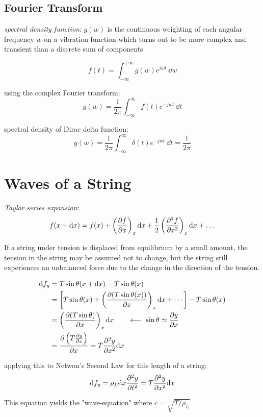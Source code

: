 \documentclass[10pt, a4paper, twocolumn]{article}
\newcommand{\deff}[1]{\par \noindent \textit{#1}: }
\newcommand{\larr}{\ensuremath{\longleftarrow\ }}
\newcommand{\intinf}{\ensuremath{\int\limits_{-\infty}^{+\infty}}}
\begin{document}
\subsection{Fourier Transform}

\deff{spectral density function}
$g(w)$ is the continuous weighting of each angular frequency $w$ on a vibration function which turns out to be more complex and transient than a discrete sum of components

\[ f(t) = \int _{-\infty}^{+\infty} g(w) e ^{i w t} \ \dd w \]

using the complex Fourier transform:
\[ g(w) = \frac{1}{2\pi}
\int _{-\infty}^{\infty} f(t) e ^{-jwt} \ \dd t \]

spectral density of Dirac delta function:
\[ g(w) = \frac{1}{2\pi}
\int _{-\infty}^{\infty} \delta (t) e ^{-jwt} \ \dd t 
= \frac{1}{2\pi} \]

\section{Waves of a String}

\deff{Taylor series expansion}
\[ f(x + \dd x) = f(x) + \left( \pdv{f}{x} \right) _x \dd x
+ \frac12 \left( \pdv[2]{f}{x} \right) _x \dd x + \dots \]

If a string under tension is displaced from equilibrium by a small amount, the tension in the string may be assumed not to change, but the string still experiences an unbalanced force due to the change in the direction of the tension.

\begin{equation*}
\begin{aligned}
\dd f_y &= T \sin \theta(x+\dd x) - T\sin \theta (x)
\\ &= \left[ T \sin \theta (x) +
\left( \pdv{(T \sin \theta (x))}{x} \right) _x \dd x
+ \cdots \right] - T \sin \theta (x)
\\ & = \left( \pdv{(T \sin \theta )}{x} \right) _x \dd x
\qquad \larr \sin \theta \simeq \pdv{y}{x}
\\ &= \pdv{\left( T \pdv{y}{x} \right)}{x} = T \pdv[2]{y}{x} \dd x
\end{aligned}
\end{equation*}

applying this to Netwon's Second Law for this length of a string:
\[ \dd f _y= \rho _L \dd x \pdv[2]{y}{t}
= T \pdv[2]{y}{x} \dd x \]

This equation yields the "wave-equation" where $c = \sqrt{T/\rho _L} $
\end{document}
